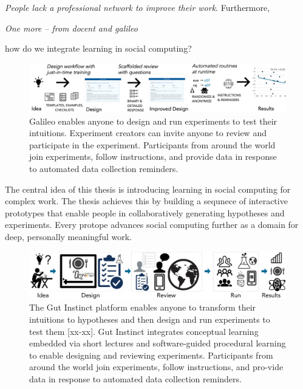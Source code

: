 \textit{People lack a professional network to improve their work}. Furthermore, 

\textit{One more -- from docent and galileo}


how do we integrate learning in social computing?

\begin{figure}[h] 
  \centering
  \includegraphics[width=1.0\textwidth]{figures/galileo/galileo-1}
  \caption[]
{Galileo enables anyone to design and run experiments to test their intuitions. Experiment creators can invite anyone to review and participate in the experiment. Participants from around the world join experiments, follow instructions, and provide data in response to automated data collection reminders.}
  \label{fig:galileo-1}
\end{figure}

The central idea of this thesis is introducing learning in social computing for complex work. 
The thesis achieves this by building a sequnece of interactive prototypes that enable people in collaboratively generating hypotheses and experiments. Every protope advances social computing further as a domain for deep, personally meaningful work. 

\begin{figure}[b] 
  \centering
  \includegraphics[width=1.0\textwidth]{figures/intro/intro-1}
  \caption[]
{The Gut Instinct platform enables anyone to transform their intuitions to hypotheses and then design and run experiments to test them [xx-xx]. Gut Instinct integrates conceptual learning embedded via short lectures and software-guided procedural learning to enable designing and reviewing experiments. Participants from around the world join experiments, follow instructions, and pro-vide data in response to automated data collection reminders. }
  \label{fig:intro-1}
\end{figure}

